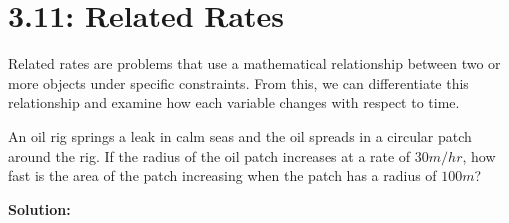 \documentclass[../mathNotesPreamble]{subfiles}
\begin{document}
\section{3.11: Related Rates}
  \begin{thmBox*}
    Related rates are problems that use a mathematical relationship between two or more objects under specific constraints. From this, we can differentiate this relationship and examine how each variable changes with respect to time.
  \end{thmBox*}

\begin{ex*}
  An oil rig springs a leak in calm seas and the oil spreads in a circular patch around the rig. If the radius of the oil patch increases at a rate of $30m/hr$, how fast is the area of the patch increasing when the patch has a radius of $100 m$?
\end{ex*}
\noindent
\textbf{Solution:}
\end{document}
